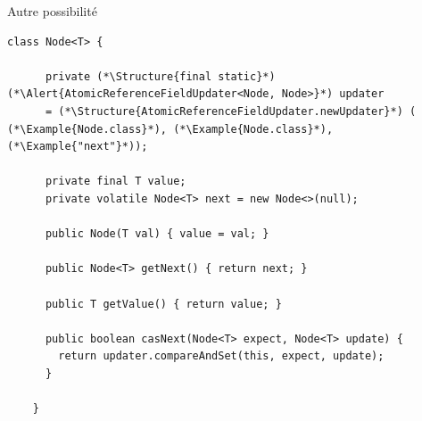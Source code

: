 
\begingroup

\begin{frame}[fragile]{Autre possibilité}

  \begin{lstlisting}[gobble=4]
    class Node<T> {
      
      private (*\Structure{final static}*)  (*\Alert{AtomicReferenceFieldUpdater<Node, Node>}*) updater
      = (*\Structure{AtomicReferenceFieldUpdater.newUpdater}*) ( (*\Example{Node.class}*), (*\Example{Node.class}*), (*\Example{"next"}*));
      
      private final T value;
      private volatile Node<T> next = new Node<>(null);

      public Node(T val) { value = val; }

      public Node<T> getNext() { return next; }
      
      public T getValue() { return value; }

      public boolean casNext(Node<T> expect, Node<T> update) {
        return updater.compareAndSet(this, expect, update);
      }

    }
  \end{lstlisting}

\end{frame}

\endgroup
\endinput
